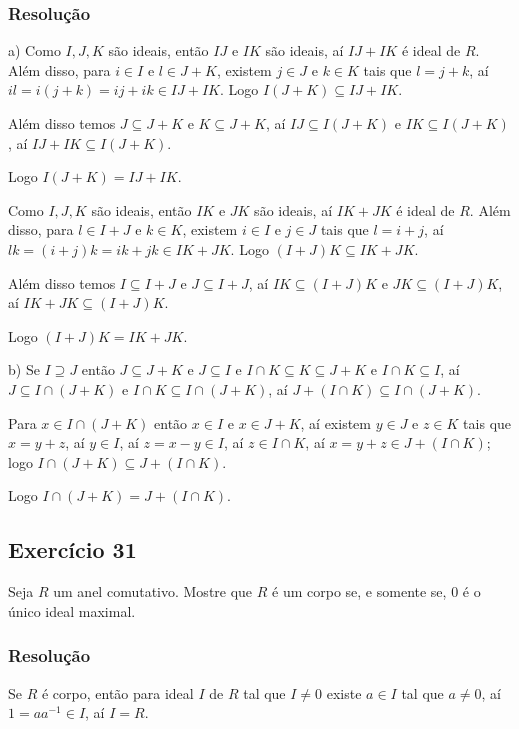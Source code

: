 \documentclass[10pt,a4paper]{article}
\begin{document}
\subsubsection*{Resolução}

a) Como $I,J,K$ são ideais, então $IJ$ e $IK$ são ideais, aí $IJ+IK$ é ideal de $R$. Além disso, para $i\in I$ e $l\in J+K$, existem $j\in J$ e $k\in K$ tais que $l=j+k$, aí $il=i(j+k)=ij+ik\in IJ+IK$. Logo $I(J+K)\subseteq IJ+IK$.

\medskip
\noindent
Além disso temos $J\subseteq J+K$ e $K\subseteq J+K$, aí $IJ\subseteq I(J+K)$ e $IK\subseteq I(J+K)$, aí $IJ+IK\subseteq I(J+K)$.

\medskip
\noindent
Logo $I(J+K)=IJ+IK$.

\medskip
\noindent
Como $I,J,K$ são ideais, então $IK$ e $JK$ são ideais, aí $IK+JK$ é ideal de $R$. Além disso, para $l\in I+J$ e $k\in K$, existem $i\in I$ e $j\in J$ tais que $l=i+j$, aí $lk=(i+j)k=ik+jk\in IK+JK$. Logo $(I+J)K\subseteq IK+JK$.

\medskip
\noindent
Além disso temos $I\subseteq I+J$ e $J\subseteq I+J$, aí $IK\subseteq (I+J)K$ e $JK\subseteq (I+J)K$, aí $IK+JK\subseteq (I+J)K$.

\medskip
\noindent
Logo $(I+J)K=IK+JK$.

\medskip
\noindent
b) Se $I\supseteq J$ então $J\subseteq J+K$ e $J\subseteq I$ e $I\cap K\subseteq K\subseteq J+K$ e $I\cap K\subseteq I$, aí $J\subseteq I\cap(J+K)$ e $I\cap K\subseteq I\cap (J+K)$, aí $J+(I\cap K)\subseteq I\cap(J+K)$.

\medskip
\noindent
Para $x\in I\cap(J+K)$ então $x\in I$ e $x\in J+K$, aí existem $y\in J$ e $z\in K$ tais que $x=y+z$, aí $y\in I$, aí $z=x-y\in I$, aí $z\in I\cap K$, aí $x=y+z\in J+(I\cap K)$; logo $I\cap(J+K)\subseteq J+(I\cap K)$.

\medskip
\noindent
Logo $I\cap(J+K)=J+(I\cap K)$.

\subsection*{Exercício 31}
Seja $R$ um anel comutativo. Mostre que $R$ é um corpo se, e somente se, $0$ é o único ideal maximal.

\subsubsection*{Resolução}

Se $R$ é corpo, então para ideal $I$ de $R$ tal que $I\neq 0$ existe $a\in I$ tal que $a\neq 0$, aí $1=aa^{-1}\in I$, aí $I=R$.
\end{document}
